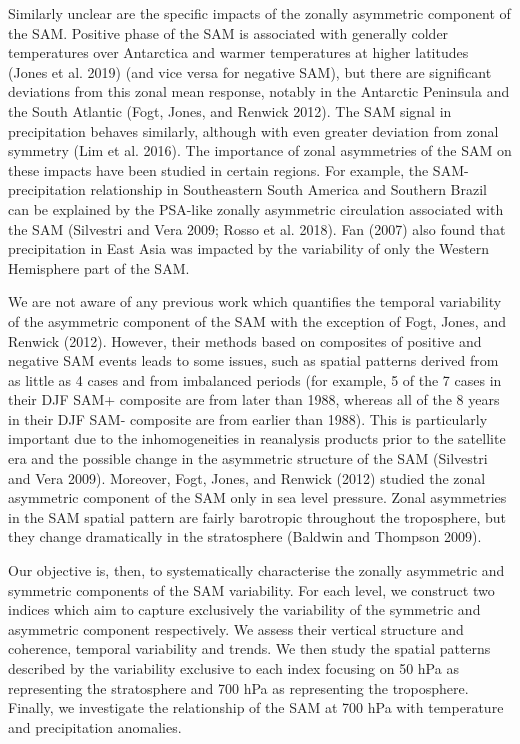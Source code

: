 \documentclass[smallextended]{svjour3}       %
\begin{document}
Similarly unclear are the specific impacts of the zonally asymmetric component of the SAM. Positive phase of the SAM is associated with generally colder temperatures over Antarctica and warmer temperatures at higher latitudes (Jones et al. 2019) (and vice versa for negative SAM), but there are significant deviations from this zonal mean response, notably in the Antarctic Peninsula and the South Atlantic (Fogt, Jones, and Renwick 2012). The SAM signal in precipitation behaves similarly, although with even greater deviation from zonal symmetry (Lim et al. 2016). The importance of zonal asymmetries of the SAM on these impacts have been studied in certain regions. For example, the SAM-precipitation relationship in Southeastern South America and Southern Brazil can be explained by the PSA-like zonally asymmetric circulation associated with the SAM (Silvestri and Vera 2009; Rosso et al. 2018). Fan (2007) also found that precipitation in East Asia was impacted by the variability of only the Western Hemisphere part of the SAM.

We are not aware of any previous work which quantifies the temporal variability of the asymmetric component of the SAM with the exception of Fogt, Jones, and Renwick (2012). However, their methods based on composites of positive and negative SAM events leads to some issues, such as spatial patterns derived from as little as 4 cases and from imbalanced periods (for example, 5 of the 7 cases in their DJF SAM+ composite are from later than 1988, whereas all of the 8 years in their DJF SAM- composite are from earlier than 1988). This is particularly important due to the inhomogeneities in reanalysis products prior to the satellite era and the possible change in the asymmetric structure of the SAM (Silvestri and Vera 2009). Moreover, Fogt, Jones, and Renwick (2012) studied the zonal asymmetric component of the SAM only in sea level pressure. Zonal asymmetries in the SAM spatial pattern are fairly barotropic throughout the troposphere, but they change dramatically in the stratosphere (Baldwin and Thompson 2009).

Our objective is, then, to systematically characterise the zonally asymmetric and symmetric components of the SAM variability. For each level, we construct two indices which aim to capture exclusively the variability of the symmetric and asymmetric component respectively. We assess their vertical structure and coherence, temporal variability and trends. We then study the spatial patterns described by the variability exclusive to each index focusing on 50 hPa as representing the stratosphere and 700 hPa as representing the troposphere. Finally, we investigate the relationship of the SAM at 700 hPa with temperature and precipitation anomalies.
\end{document}

